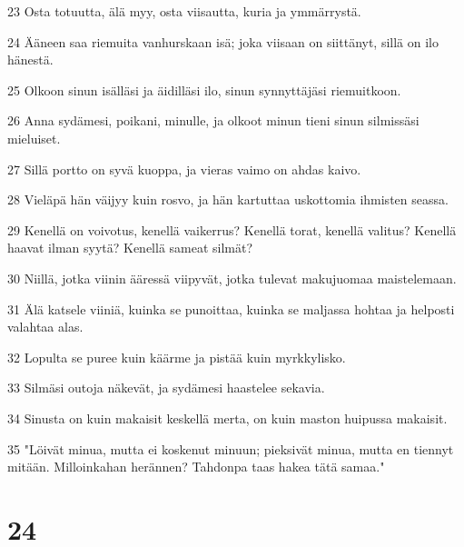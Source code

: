 \par 23 Osta totuutta, älä myy, osta viisautta, kuria ja ymmärrystä.
\par 24 Ääneen saa riemuita vanhurskaan isä; joka viisaan on siittänyt, sillä on ilo hänestä.
\par 25 Olkoon sinun isälläsi ja äidilläsi ilo, sinun synnyttäjäsi riemuitkoon.
\par 26 Anna sydämesi, poikani, minulle, ja olkoot minun tieni sinun silmissäsi mieluiset.
\par 27 Sillä portto on syvä kuoppa, ja vieras vaimo on ahdas kaivo.
\par 28 Vieläpä hän väijyy kuin rosvo, ja hän kartuttaa uskottomia ihmisten seassa.
\par 29 Kenellä on voivotus, kenellä vaikerrus? Kenellä torat, kenellä valitus? Kenellä haavat ilman syytä? Kenellä sameat silmät?
\par 30 Niillä, jotka viinin ääressä viipyvät, jotka tulevat makujuomaa maistelemaan.
\par 31 Älä katsele viiniä, kuinka se punoittaa, kuinka se maljassa hohtaa ja helposti valahtaa alas.
\par 32 Lopulta se puree kuin käärme ja pistää kuin myrkkylisko.
\par 33 Silmäsi outoja näkevät, ja sydämesi haastelee sekavia.
\par 34 Sinusta on kuin makaisit keskellä merta, on kuin maston huipussa makaisit.
\par 35 "Löivät minua, mutta ei koskenut minuun; pieksivät minua, mutta en tiennyt mitään. Milloinkahan herännen? Tahdonpa taas hakea tätä samaa."

\chapter{24}

